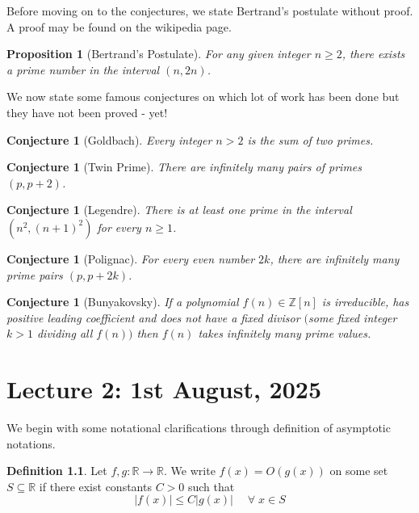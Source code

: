 \documentclass[10pt,openany]{book}
\newtheorem{proposition}[theorem]{Proposition}
\newtheorem{conjecture}[theorem]{Conjecture}
\theoremstyle{italicnonumber}
\theoremstyle{definition}
\newtheorem{definition}[theorem]{Definition}
\let\oldforall\forall
\renewcommand{\forall}{\;\oldforall\;}
\newcommand{\Z}{\mathbb{Z}}
\newcommand{\R}{\mathbb{R}}
\newcommand{\su}{\subseteq}
\begin{document}
Before moving on to the conjectures, we state Bertrand's postulate without proof. A proof may be found on the wikipedia page.

\begin{proposition} [Bertrand's Postulate]
  For any given integer $n \geq 2$, there exists a prime number in the interval $(n,2n)$.
\end{proposition}

We now state some famous conjectures on which lot of work has been done but they have not been proved - yet!

\begin{conjecture} [Goldbach]
  Every integer $ n > 2$ is the sum of two primes.
\end{conjecture}

\begin{conjecture} [Twin Prime]
  There are infinitely many pairs of primes $(p,p+2)$.
\end{conjecture}

\begin{conjecture} [Legendre]
  There is at least one prime in the interval $(n^2,(n+1)^2)$ for every $n \geq 1$.
\end{conjecture}

\begin{conjecture} [Polignac]
  For every even number $2k$, there are infinitely many prime pairs $(p,p+2k)$.
\end{conjecture}

\begin{conjecture} [Bunyakovsky]
  If a polynomial $f(n) \in \Z[n]$ is irreducible, has positive leading coefficient and does not have a fixed divisor $($some fixed integer $k > 1$ dividing all $f(n))$ then $f(n)$ takes infinitely many prime values.
\end{conjecture}

\chapter{Lecture 2: 1st August, 2025}

We begin with some notational clarifications through definition of asymptotic notations.

\begin{definition}
Let $f, g : \mathbb{R} \to \mathbb{R}$. We write $f(x) = O(g(x))$ on some set $S \su \R$ if there exist constants $C > 0$ such that
\[
|f(x)| \leq C |g(x)| \quad \forall x \in S
\]
\end{definition}
\end{document}
